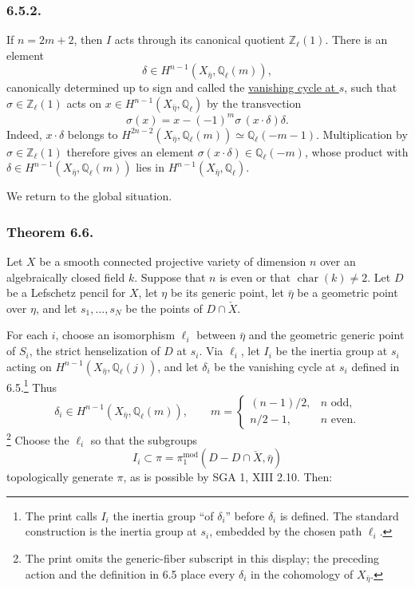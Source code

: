 \subsubsection*{6.5.2.}
If $n=2m+2$, then $I$ acts through its canonical quotient
$\mathbb Z_\ell(1)$.  There is an element
\[
\delta\in H^{n-1}(X_{\bar\eta},\mathbb Q_\ell(m)),
\]
canonically determined up to sign and called the \underline{vanishing
cycle at $s$}, such that $\sigma\in\mathbb Z_\ell(1)$ acts on
$x\in H^{n-1}(X_{\bar\eta},\mathbb Q_\ell)$ by the transvection
\begin{equation}\tag{6.5.2.1}
\sigma(x)=x-(-1)^m\sigma\,(x\cdot\delta)\delta.
\end{equation}
Indeed, $x\cdot\delta$ belongs to
$H^{2n-2}(X_{\bar\eta},\mathbb Q_\ell(m))\simeq\mathbb Q_\ell(-m-1)$.
Multiplication by $\sigma\in\mathbb Z_\ell(1)$ therefore gives an
element $\sigma(x\cdot\delta)\in\mathbb Q_\ell(-m)$, whose product with
$\delta\in H^{n-1}(X_{\bar\eta},\mathbb Q_\ell(m))$ lies in
$H^{n-1}(X_{\bar\eta},\mathbb Q_\ell)$.

We return to the global situation.

\subsubsection*{Theorem 6.6.}
Let $X$ be a smooth connected projective variety of dimension $n$ over
an algebraically closed field $k$.  Suppose that $n$ is even or that
$\operatorname{char}(k)\ne2$.  Let $D$ be a Lefschetz pencil for $X$,
let $\eta$ be its generic point, let $\bar\eta$ be a geometric point
over $\eta$, and let $s_1,\ldots,s_N$ be the points of
$D\cap\check X$.

For each $i$, choose an isomorphism $\ell_i$ between $\bar\eta$ and the
geometric generic point of $S_i$, the strict henselization of $D$ at
$s_i$.  Via $\ell_i$, let $I_i$ be the inertia group at $s_i$ acting on
$H^{n-1}(X_{\bar\eta},\mathbb Q_\ell(j))$, and let $\delta_i$ be the
vanishing cycle at $s_i$ defined in 6.5.\footnote{The print calls
$I_i$ the inertia group ``of $\delta_i$'' before $\delta_i$ is defined.
The standard construction is the inertia group at $s_i$, embedded by
the chosen path $\ell_i$.}
Thus
\[
\delta_i\in H^{n-1}(X_{\bar\eta},\mathbb Q_\ell(m)),
\qquad
m=\begin{cases}
(n-1)/2,& n\text{ odd},\\
n/2-1,& n\text{ even}.
\end{cases}
\]
\footnote{The print omits the generic-fiber subscript in this display;
the preceding action and the definition in 6.5 place every
$\delta_i$ in the cohomology of $X_{\bar\eta}$.}
Choose the $\ell_i$ so that the subgroups
\[
I_i\subset
\pi=\pi_1^{\mathrm{mod}}(D-D\cap\check X,\bar\eta)
\]
topologically generate $\pi$, as is possible by SGA 1, XIII 2.10.
Then:

